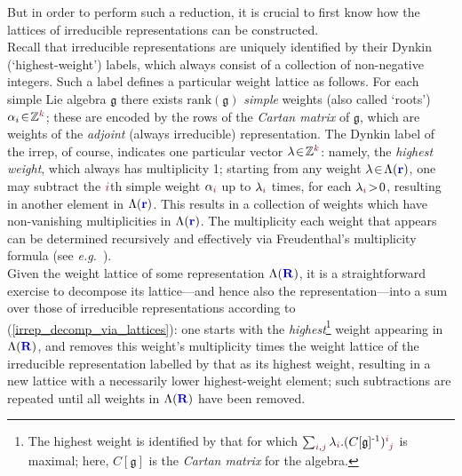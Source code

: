 \documentclass[12pt,a4paper]{article}\let\ifpdf\relax
\begin{document}
But in order to perform such a reduction, it is crucial to first know how the lattices of irreducible representations can be constructed.\\[-10pt]





Recall that irreducible representations are uniquely identified by their Dynkin (`highest-weight') labels, which always consist of a collection of non-negative integers. Such a label defines a particular weight lattice as follows. For each simple Lie algebra $\mathfrak{g}$ there exists $\mathrm{rank}(\mathfrak{g})$ \emph{simple} weights (also called `roots') $\alpha_i\!\in\!\mathbb{Z}^{\r{k}}$; these are encoded by the rows of the \emph{Cartan matrix} of $\mathfrak{g}$, which are weights of the \emph{adjoint} (always irreducible) representation. The Dynkin label of the irrep, of course, indicates one particular vector $\lambda\!\in\!\mathbb{Z}^{\r{k}}$: namely, the \emph{highest weight}, which always has multiplicity 1; starting from any weight $\lambda\!\in\!\Lambda(\mathbf{\b{r}})$, one may subtract the $\r{i}$th simple weight $\alpha_{\r{i}}$ up to $\lambda_{\r{i}}$ times, for each $\lambda_{\r{i}}\!>\!0$, resulting in another element in $\Lambda(\mathbf{\b{r}})$. This results in a collection of weights which have non-vanishing multiplicities in $\Lambda(\mathbf{\b{r}})$. The multiplicity each weight that appears can be determined recursively and effectively via Freudenthal's multiplicity formula (see \emph{e.g.}~\cite{MR656202}).\\[-8pt]


Given the weight lattice of some representation $\Lambda(\mathbf{\b{R}})$, it is a straightforward exercise to decompose its lattice---and hence also the representation---into a sum over those of irreducible representations according to (\ref{irrep_decomp_via_lattices}): one starts with the \emph{highest}\footnote{The highest weight is identified by that for which $\sum_{\r{i},\r{j}}\lambda_{\r{i}}.(C[\mathfrak{g}]^{\text{-}1})\indices{\r{i}}{\r{j}}$ is maximal; here, $C[\mathfrak{g}]$ is the \emph{Cartan matrix} for the algebra.} weight appearing in $\Lambda(\mathbf{\b{R}})$, and removes this weight's multiplicity times the weight lattice of the irreducible representation labelled by that as its highest weight, resulting in a new lattice with a necessarily lower highest-weight element; such subtractions are repeated until all weights in $\Lambda(\mathbf{\b{R}})$ have been removed. 
\end{document}
